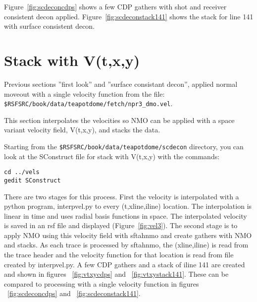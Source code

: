Figure~\ref{fig:scdeconcdps} shows a few CDP gathers with shot and receiver consistent decon applied.  Figure~\ref{fig:scdeconstack141} shows the stack for line 141 with surface consistent decon.



\section{Stack with V(t,x,y)}

Previous sections ''first look'' and  ''surface consistant decon'', applied normal moveout  with a single velocity function from the file:
\texttt{\$RSFSRC/book/data/teapotdome/fetch/npr3\_dmo.vel}.

This section interpolates the velocities so NMO can be applied with a space variant velocity field, V(t,x,y), and stacks the data.

Starting from the \texttt{\$RSFSRC/book/data/teapotdome/scdecon} directory, you can look at the SConstruct file for stack with V(t,x,y) with the commands:
\begin{verbatim}  
cd ../vels
gedit SConstruct
\end{verbatim}  

There are two stages for this process.  First the velocity is interpolated with a python program, interpvel.py to every (t,xline,iline) location.  The interpolation is linear in time and uses radial basis functions in space.  The interpolated velocity is saved in an rsf file and displayed (Figure~\ref{fig:vel3}). The second stage is to apply NMO using this velocity field with sftahnmo and create gathers with NMO and stacks.  As each trace is processed by sftahnmo, the (xline,iline) is read from the trace header and the velocity function for that location is read from file created by interpvel.py.  A few CDP gathers and a stack of iline 141 are created and shown in figures ~\ref{fig:vtxycdps} and ~\ref{fig:vtxystack141}.  These can be compared to processing with a single velocity function in figures ~\ref{fig:scdeconcdps} and ~\ref{fig:scdeconstack141}.


